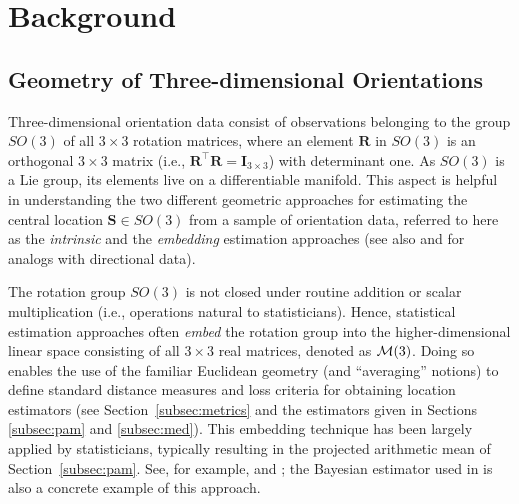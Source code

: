 
\section{Background}\label{ch:bg}
\subsection{Geometry of Three-dimensional Orientations}
\label{subsec:geometry}

Three-dimensional orientation data consist of  observations belonging to the group $SO(3)$ 
of all $3\times 3$ rotation matrices, where an element $\bm R$ in $SO(3)$ is an orthogonal 
$3\times 3$ matrix (i.e., $\bm{R}^\top \bm{R}=\bm{I}_{3\times3}$) with
determinant one.  As $SO(3)$ is a Lie group, its elements live on a differentiable
manifold.  This aspect is helpful in understanding the two different geometric approaches 
for estimating the central location $\bm{S} \in SO(3)$ from a sample of orientation data, referred to here 
as the \textit{intrinsic}  and  the \textit{embedding} estimation approaches (see also \citet{jupp89} and \citet{mardia00} for analogs with directional data).

The rotation group $SO(3)$ is not closed under routine addition or scalar multiplication (i.e., operations natural to statisticians). Hence, statistical estimation approaches often \textit{embed} the rotation group into the higher-dimensional linear space consisting of all $3\times 3$ real matrices, denoted as $\mathcal{M}(3)$.  Doing so enables the use of the familiar Euclidean geometry (and ``averaging'' notions) to define standard distance measures  and loss criteria for obtaining location estimators (see Section~\ref{subsec:metrics} and the estimators given in Sections \ref{subsec:pam} and \ref{subsec:med}).  This embedding technique has been largely  applied by statisticians, typically resulting in the projected arithmetic mean of Section~\ref{subsec:pam}.
See, for example, \cite{downs72, khatri77} and \cite{jupp79, jupp89}; the Bayesian estimator used in \cite{bingham10} is also a concrete example of this
approach.


